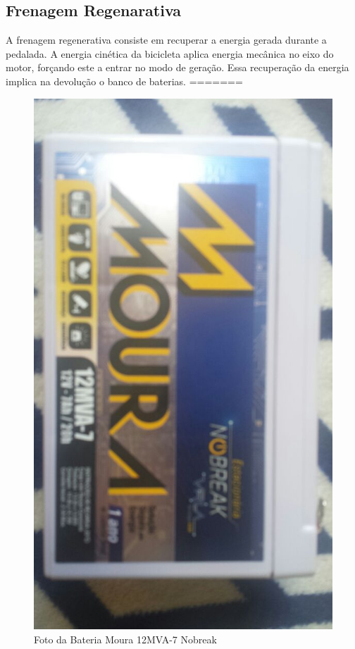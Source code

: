 \subsection{Frenagem Regenarativa}
A frenagem regenerativa consiste em recuperar a energia gerada durante a pedalada. A energia cinética da bicicleta aplica energia mecânica no eixo do motor, forçando este a entrar no modo de geração. Essa recuperação da energia implica na devolução o banco de baterias. 
=======
	\begin{figure}[H]
		\centering
		\includegraphics[scale=0.3, angle=90]{bateria_bike.jpeg}
		\caption{Foto da Bateria Moura 12MVA-7 Nobreak}
		\label{img:bateriabike}
	\end{figure}
	
